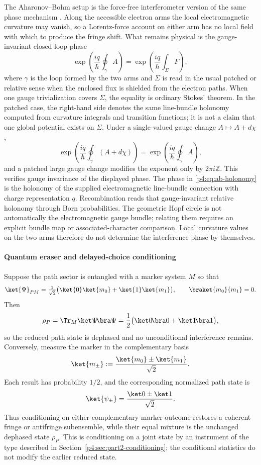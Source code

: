 \documentclass[12pt,a4paper]{article}
\begin{document}
The Aharonov--Bohm setup is the force-free interferometer version of the same phase mechanism \cite{AharonovBohm1959,WuYang1975}.
Along the accessible electron arms the local electromagnetic curvature may vanish, so a Lorentz-force account on either arm has no local field with which to produce the fringe shift.
What remains physical is the gauge-invariant closed-loop phase
\begin{equation}
\label{p4:eq:ab-holonomy}
\exp\!\left(\frac{iq}{\hbar}\oint_\gamma A\right)
=
\exp\!\left(\frac{iq}{\hbar}\int_\Sigma F\right),
\end{equation}
where \(\gamma\) is the loop formed by the two arms and \(\Sigma\) is read in the usual patched or relative sense when the enclosed flux is shielded from the electron paths.
When one gauge trivialization covers \(\Sigma\), the equality is ordinary
Stokes' theorem.  In the patched case, the right-hand side denotes the same
line-bundle holonomy computed from curvature integrals and transition
functions; it is not a claim that one global potential exists on \(\Sigma\).
Under a single-valued gauge change \(A\mapsto A+d\chi\),
\[
 \exp\!\left(\frac{iq}{\hbar}\oint_\gamma(A+d\chi)\right)
 =
 \exp\!\left(\frac{iq}{\hbar}\oint_\gamma A\right),
\]
and a patched large gauge change modifies the exponent only by
\(2\pi i\mathbb Z\).  This verifies gauge invariance of the displayed phase.
The phase in \eqref{p4:eq:ab-holonomy} is the holonomy of the supplied
electromagnetic line-bundle connection with charge representation \(q\).
Recombination reads that gauge-invariant relative holonomy through Born
probabilities.  The geometric Hopf circle is not automatically the
electromagnetic gauge bundle; relating them requires an explicit bundle map
or associated-character comparison.  Local curvature values on the two arms
therefore do not determine the interference phase by themselves.



\paragraph{Quantum eraser and delayed-choice conditioning}
\label{p4:sec:part2-eraser}

Suppose the path sector is entangled with a marker system $M$ so that
\[
\ket{\Psi}_{PM}=\tfrac{1}{\sqrt2}\bigl(\ket{0}\ket{m_0}+\ket{1}\ket{m_1}\bigr),
\qquad
\braket{m_0}{m_1}=0.
\]
Then
\[
 \rho_P=\Tr_M\ket\Psi\!\bra\Psi
 =\frac12\bigl(\ket0\!\bra0+\ket1\!\bra1\bigr),
\]
so the reduced path state is dephased and no unconditional interference
remains.  Conversely, measure the marker in the complementary basis
\[
 \ket{m_\pm}:=\frac{\ket{m_0}\pm\ket{m_1}}{\sqrt2}.
\]
Each result has probability \(1/2\), and the corresponding normalized path
state is
\[
 \ket{\psi_\pm}=\frac{\ket0\pm\ket1}{\sqrt2}.
\]
Thus conditioning on either complementary marker outcome restores a coherent
fringe or antifringe subensemble, while their equal mixture is the unchanged
dephased state \(\rho_P\).
This is conditioning on a joint state by an instrument of the type described in Section~\ref{p4:sec:part2-conditioning}; the conditional statistics do not modify the earlier reduced state.
\end{document}
